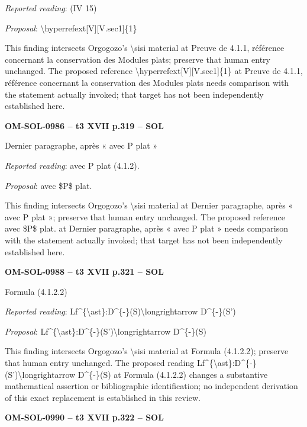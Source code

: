 \emph{Reported reading}: (IV 15)\par
\emph{Proposal}: \textbackslash{}hyperrefext[V][V.sec1]\{1\}\par
This finding intersects Orgogozo's \textbackslash{}sisi material at Preuve de 4.1.1, référence concernant la conservation des Modules plats; preserve that human entry unchanged. The proposed reference \textbackslash{}hyperrefext[V][V.sec1]\{1\} at Preuve de 4.1.1, référence concernant la conservation des Modules plats needs comparison with the statement actually invoked; that target has not been independently established here.\par
\par\noindent\textbf{OM-SOL-0986 -- t3 XVII p.319 -- SOL}\par
Dernier paragraphe, après « avec P plat »\par
\emph{Reported reading}: avec P plat (4.1.2).\par
\emph{Proposal}: avec \$P\$ plat.\par
This finding intersects Orgogozo's \textbackslash{}sisi material at Dernier paragraphe, après « avec P plat »; preserve that human entry unchanged. The proposed reference avec \$P\$ plat. at Dernier paragraphe, après « avec P plat » needs comparison with the statement actually invoked; that target has not been independently established here.\par
\par\noindent\textbf{OM-SOL-0988 -- t3 XVII p.321 -- SOL}\par
Formula (4.1.2.2)\par
\emph{Reported reading}: Lf\textasciicircum{}\{\textbackslash{}ast\}:D\textasciicircum{}\{-\}(S)\textbackslash{}longrightarrow D\textasciicircum{}\{-\}(S')\par
\emph{Proposal}: Lf\textasciicircum{}\{\textbackslash{}ast\}:D\textasciicircum{}\{-\}(S')\textbackslash{}longrightarrow D\textasciicircum{}\{-\}(S)\par
This finding intersects Orgogozo's \textbackslash{}sisi material at Formula (4.1.2.2); preserve that human entry unchanged. The proposed reading Lf\textasciicircum{}\{\textbackslash{}ast\}:D\textasciicircum{}\{-\}(S')\textbackslash{}longrightarrow D\textasciicircum{}\{-\}(S) at Formula (4.1.2.2) changes a substantive mathematical assertion or bibliographic identification; no independent derivation of this exact replacement is established in this review.\par
\par\noindent\textbf{OM-SOL-0990 -- t3 XVII p.322 -- SOL}\par

